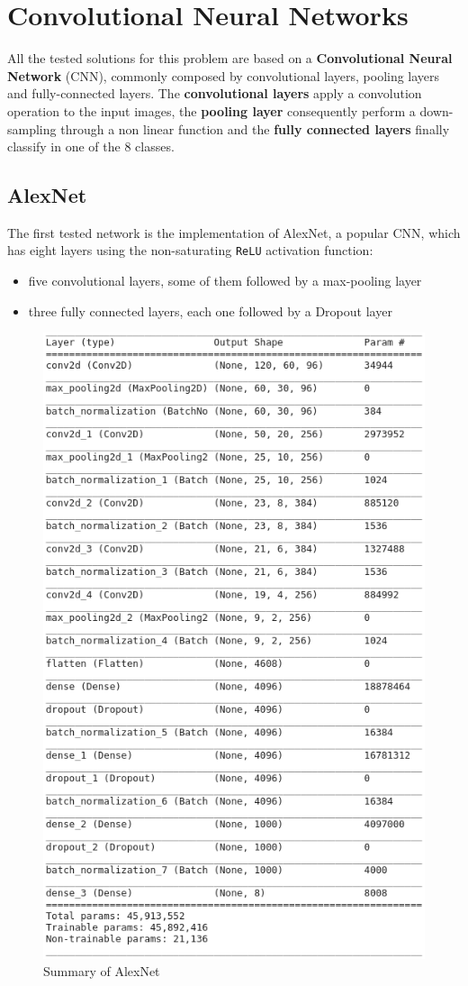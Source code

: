 \documentclass[11pt]{article}
\begin{document}
	\section{Convolutional Neural Networks}
	All the tested solutions for this problem are based on a \textbf{Convolutional Neural Network} (CNN),
	commonly composed by convolutional layers, pooling layers and fully-connected layers.
	The \textbf{convolutional layers} apply a convolution operation to the input images,
	the \textbf{pooling layer} consequently perform a down-sampling through a non linear
	function and the \textbf{fully connected layers} finally classify in one of the 8 classes.


	\subsection{AlexNet}
	The first tested network is the implementation of AlexNet, a popular CNN,
	which has eight layers using the non-saturating \texttt{ReLU} activation function:
	\begin{itemize}
		\item five convolutional layers, some of them followed by a max-pooling layer
		\item three fully connected layers, each one followed by a Dropout layer
	\end{itemize}

	\begin{figure}[H]
		\centering
		\includegraphics[width=.8\textwidth]{assets/AlexNet.png}
		\caption{Summary of AlexNet}
	\end{figure}
\end{document}
